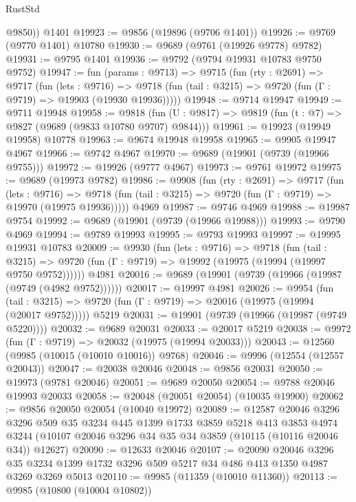 \begin{lexlean}{RustStd}
\begin{coremodule}
        @9850))
    @1401
@19923 := @9856 (@19896 (@9706 @1401))
@19926 := @9769 (@9770 @1401) @10780
@19930 := @9689 (@9761 (@19926 @9778) @9782)
@19931 := @9795 @1401
@19936 := @9792 (@9794 @19931 @10783 @9750 @9752)
@19947 := fun (params : @9713) =>
  @9715
    (fun (rty : @2691) =>
    @9717
      (fun (lets : @9716) =>
      @9718 (fun (tail : @3215) => @9720 (fun (Γ : @9719) => @19903 (@19930 @19936)))))
@19948 := @9714 @19947
@19949 := @9711 @19948
@19958 := @9818
    (fun (U : @9817) => @9819 (fun (t : @7) => @9827 (@9689 (@9833 @10780 @9707) @9844)))
@19961 := @19923 (@19949 @19958) @10778
@19963 := @9674 @19948 @19958
@19965 := @9905 @19947 @4967
@19966 := @9742 @4967
@19970 := @9689 (@19901 (@9739 (@19966 @9755)))
@19972 := @19926 (@9777 @4967)
@19973 := @9761 @19972
@19975 := @9689 (@19973 @9782)
@19986 := @9908
    (fun (rty : @2691) =>
    @9717
      (fun (lets : @9716) =>
      @9718 (fun (tail : @3215) => @9720 (fun (Γ : @9719) => @19970 (@19975 @19936)))))
    @4969
@19987 := @9746 @4969
@19988 := @19987 @9754
@19992 := @9689 (@19901 (@9739 (@19966 @19988)))
@19993 := @9790 @4969
@19994 := @9789 @19993
@19995 := @9793 @19993
@19997 := @19995 @19931 @10783
@20009 := @9930
    (fun (lets : @9716) =>
    @9718
      (fun (tail : @3215) =>
      @9720 (fun (Γ : @9719) => @19992 (@19975 (@19994 (@19997 @9750 @9752))))))
    @4981
@20016 := @9689 (@19901 (@9739 (@19966 (@19987 (@9749 (@4982 @9752))))))
@20017 := @19997 @4981
@20026 := @9954
    (fun (tail : @3215) => @9720 (fun (Γ : @9719) => @20016 (@19975 (@19994 (@20017 @9752)))))
    @5219
@20031 := @19901 (@9739 (@19966 (@19987 (@9749 @5220))))
@20032 := @9689 @20031
@20033 := @20017 @5219
@20038 := @9972 (fun (Γ : @9719) => @20032 (@19975 (@19994 @20033)))
@20043 := @12560 (@9985 (@10015 (@10010 @10016)) @9768)
@20046 := @9996 (@12554 (@12557 @20043))
@20047 := @20038 @20046
@20048 := @9856 @20031
@20050 := @19973 (@9781 @20046)
@20051 := @9689 @20050
@20054 := @9788 @20046 @19993 @20033
@20058 := @20048 (@20051 @20054) (@10035 @19900)
@20062 := @9856 @20050 @20054 (@10040 @19972)
@20089 := @12587
    @20046
    @3296
    @3296
    @509
    @35
    @3234
    @445
    @1399
    @1733
    @3859
    @5218
    @413
    @3853
    @4974
    @3244
    (@10107 @20046 @3296 @34 @35 @34 @3859 (@10115 (@10116 @20046 @34)) @12627)
@20090 := @12633 @20046
@20107 := @20090
    @20046
    @3296
    @35
    @3234
    @1399
    @1732
    @3296
    @509
    @5217
    @34
    @486
    @413
    @1350
    @4987
    @3269
    @3269
    @5013
@20110 := @9985 (@11359 (@10010 @11360))
@20113 := @9985 (@10800 (@10004 @10802))

\end{coremodule}
\end{lexlean}

